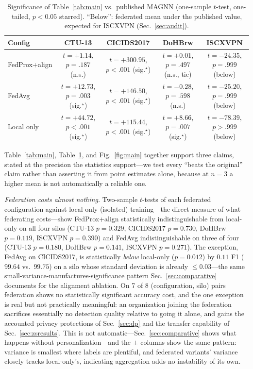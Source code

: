 \documentclass[journal]{IEEEtran}
\begin{document}
\begin{table}[!t]
\caption{Significance of Table~\ref{tab:main} vs.\ published MAGNN
(one-sample $t$-test, one-tailed, $p<0.05$ starred). ``Below'':
federated mean under the published value, expected for ISCXVPN
(Sec.~\ref{sec:audit}).}
\label{tab:sig}
\centering
\footnotesize
\begin{tabular}{lcccc}
\toprule
Config & CTU-13 & CICIDS2017 & DoHBrw & ISCXVPN \\
\midrule
FedProx+align &
  $t{=}{+}1.14$, $p{=}.187$ (n.s.) &
  $t{=}{+}300.95$, $p{<}.001$ (sig.$^\star$) &
  $t{=}{+}0.01$, $p{=}.497$ (n.s., tie) &
  $t{=}{-}24.35$, $p{=}.999$ (below) \\
FedAvg &
  $t{=}{+}12.73$, $p{=}.003$ (sig.$^\star$) &
  $t{=}{+}146.50$, $p{<}.001$ (sig.$^\star$) &
  $t{=}{-}0.28$, $p{=}.598$ (n.s.) &
  $t{=}{-}25.20$, $p{=}.999$ (below) \\
Local only &
  $t{=}{+}44.72$, $p{<}.001$ (sig.$^\star$) &
  $t{=}{+}115.44$, $p{<}.001$ (sig.$^\star$) &
  $t{=}{+}8.66$, $p{=}.007$ (sig.$^\star$) &
  $t{=}{-}78.39$, $p{>}.999$ (below) \\
\bottomrule
\end{tabular}
\normalsize
\end{table}

Table~\ref{tab:main}, Table~\ref{tab:sig}, and Fig.~\ref{fig:main}
together support three claims, stated at the precision the statistics
support---we test every ``beats the original'' claim rather than
asserting it from point estimates alone, because at $n{=}3$ a higher
mean is not automatically a reliable one.

\emph{Federation costs almost nothing.} Two-sample $t$-tests of each
federated configuration against local-only (isolated) training---the
direct measure of what federating costs---show FedProx+align
statistically indistinguishable from local-only on all four silos
(CTU-13 $p{=}0.329$, CICIDS2017 $p{=}0.730$, DoHBrw $p{=}0.119$,
ISCXVPN $p{=}0.390$) and FedAvg indistinguishable on three of four
(CTU-13 $p{=}0.180$, DoHBrw $p{=}0.141$, ISCXVPN $p{=}0.271$). The
exception, FedAvg on CICIDS2017, is statistically \emph{below}
local-only ($p{=}0.012$) by $0.11$ F1 ($99.64$ vs.\ $99.75$) on a silo
whose standard deviation is already $\le 0.03$---the same
small-variance-manufactures-significance pattern
Sec.~\ref{sec:comparative} documents for the alignment ablation. On 7
of 8 (configuration, silo) pairs federation shows no statistically
significant accuracy cost, and the one exception is real but not
practically meaningful: an organization joining the federation
sacrifices essentially no detection quality relative to going it
alone, and gains the accounted privacy protections of
Sec.~\ref{sec:dp} and the transfer capability of
Sec.~\ref{sec:zsresults}. This is not automatic---Sec.~\ref{sec:comparative}
shows what happens without personalization---and the $\pm$ columns
show the same pattern: variance is smallest where labels are plentiful,
and federated variants' variance closely tracks local-only's,
indicating aggregation adds no instability of its own.
\end{document}
